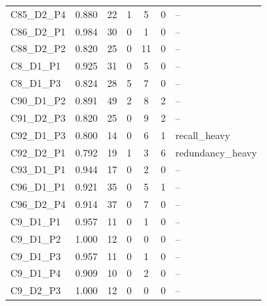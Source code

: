 {\begin{tabular}{p{2.6cm}ccccc p{4.8cm}}
 C85\_D2\_P4 & 0.880 & 22 & 1 & 5 & 0 & -- \\
 C86\_D2\_P1 & 0.984 & 30 & 0 & 1 & 0 & -- \\
 C88\_D2\_P2 & 0.820 & 25 & 0 & 11 & 0 & -- \\
 C8\_D1\_P1 & 0.925 & 31 & 0 & 5 & 0 & -- \\
 C8\_D1\_P3 & 0.824 & 28 & 5 & 7 & 0 & -- \\
 C90\_D1\_P2 & 0.891 & 49 & 2 & 8 & 2 & -- \\
 C91\_D2\_P3 & 0.820 & 25 & 0 & 9 & 2 & -- \\
 C92\_D1\_P3 & 0.800 & 14 & 0 & 6 & 1 & recall\_heavy \\
 C92\_D2\_P1 & 0.792 & 19 & 1 & 3 & 6 & redundancy\_heavy \\
 C93\_D1\_P1 & 0.944 & 17 & 0 & 2 & 0 & -- \\
 C96\_D1\_P1 & 0.921 & 35 & 0 & 5 & 1 & -- \\
 C96\_D2\_P4 & 0.914 & 37 & 0 & 7 & 0 & -- \\
 C9\_D1\_P1 & 0.957 & 11 & 0 & 1 & 0 & -- \\
 C9\_D1\_P2 & 1.000 & 12 & 0 & 0 & 0 & -- \\
 C9\_D1\_P3 & 0.957 & 11 & 0 & 1 & 0 & -- \\
 C9\_D1\_P4 & 0.909 & 10 & 0 & 2 & 0 & -- \\
 C9\_D2\_P3 & 1.000 & 12 & 0 & 0 & 0 & -- \\
\bottomrule
\end{tabular}
}